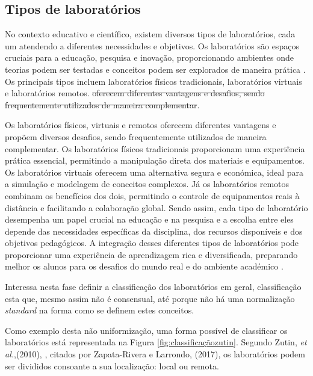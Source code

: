 
\subsection{Tipos de laboratórios} %
\label{sec:tiposlaboratorios}
No contexto educativo e científico, existem diversos tipos de laboratórios, cada um atendendo a diferentes necessidades e objetivos. Os laboratórios são espaços cruciais para a educação, pesquisa e inovação, proporcionando ambientes onde teorias podem ser testadas e conceitos podem ser explorados de maneira prática \cite{Hofsteinfoundations}. Os principais tipos incluem laboratórios físicos tradicionais, laboratórios virtuais e laboratórios remotos. \sout {oferecem diferentes vantagens e desafios, sendo frequentemente utilizados de maneira complementar}.

Os laboratórios físicos, virtuais e remotos oferecem diferentes vantagens e propõem diversos desafios, sendo frequentemente utilizados de maneira complementar. Os laboratórios físicos tradicionais proporcionam uma experiência prática essencial, permitindo a manipulação direta dos materiais e equipamentos. Os laboratórios virtuais oferecem uma alternativa segura e económica, ideal para a simulação e modelagem de conceitos complexos. Já os laboratórios remotos combinam os benefícios dos dois, permitindo o controle de equipamentos reais à distância e facilitando a colaboração global. Sendo assim, cada tipo de laboratório desempenha um papel crucial na educação e na pesquisa e a escolha entre eles depende das necessidades específicas da disciplina, dos recursos disponíveis e dos objetivos pedagógicos. A integração desses diferentes tipos de laboratórios pode proporcionar uma experiência de aprendizagem rica e diversificada, preparando melhor os alunos para os desafios do mundo real e do ambiente académico \cite{BRINSON2015218} \cite{ImpactRemoteLabTeachingPractices} \cite{Hofsteinfoundations}.

Interessa nesta fase definir a classificação dos laboratórios em geral, classificação esta que, mesmo assim não é consensual, até porque não há uma normalização \textit{standard} na forma como se definem estes conceitos.

Como exemplo desta não uniformização, uma forma possível de classificar os laboratórios está representada na Figura \ref{fig:classificaçãozutin}. Segundo Zutin, \textit{et al.},(2010), \cite{zutinlab2go}, citados por Zapata-Rivera e Larrondo, (2017), \cite{Zapata-Rivera} os laboratórios podem ser divididos consoante a sua localização: local ou remota.

